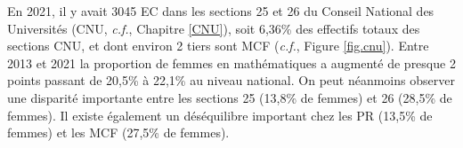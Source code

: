 
En 2021, il y avait 3045 EC dans les sections 25 et 26 du Conseil National des Universit\'es (CNU, \textit{c.f.}, Chapitre \ref{CNU}), soit 6,36\% des effectifs totaux des sections CNU, et dont environ 2 tiers sont MCF (\textit{c.f.}, Figure \ref{fig.cnu}). Entre 2013 et 2021 la proportion de femmes en math\'ematiques a augment\'e de presque 2 points passant de 20,5\% \`a 22,1\% au niveau national. On peut n\'eanmoins observer une disparit\'e importante entre les sections 25 (13,8\% de femmes) et 26 (28,5\% de femmes). Il existe \'egalement un d\'es\'equilibre important chez les PR (13,5\% de femmes) et les MCF (27,5\% de femmes).

\begin{figure}[t]
\hfill
{}
\hfill
\begin{center}
\end{center}
\end{figure}
